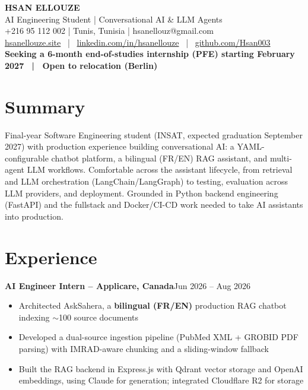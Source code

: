 \documentclass[10pt,a4paper]{article}
\newcommand{\entry}[2]{\vspace{1pt}\noindent\textbf{#1}\hfill{\color{muted}#2}\par}
\begin{document}
\begin{center}
  {\LARGE\bfseries HSAN ELLOUZE}\\[2pt]
  {\color{muted} AI Engineering Student | Conversational AI \& LLM Agents}\\[2pt]
  {\footnotesize +216 95 112 002 | Tunis, Tunisia | hsanellouz@gmail.com}\\[1pt]
  {\footnotesize \href{https://hsanellouze.site}{hsanellouze.site} \ | \ \href{https://linkedin.com/in/hsanellouze}{linkedin.com/in/hsanellouze} \ | \ \href{https://github.com/Hsan003}{github.com/Hsan003}}\\[3pt]
  {\footnotesize\bfseries Seeking a 6-month end-of-studies internship (PFE) starting February 2027 \ | \ Open to relocation (Berlin)}
\end{center}

\section{Summary}
Final-year Software Engineering student (INSAT, expected graduation September 2027) with production experience building conversational AI: a YAML-configurable chatbot platform, a bilingual (FR/EN) RAG assistant, and multi-agent LLM workflows. Comfortable across the assistant lifecycle, from retrieval and LLM orchestration (LangChain/LangGraph) to testing, evaluation across LLM providers, and deployment. Grounded in Python backend engineering (FastAPI) and the fullstack and Docker/CI-CD work needed to take AI assistants into production.

\section{Experience}
\entry{AI Engineer Intern -- Applicare, Canada}{Jun 2026 -- Aug 2026}
\begin{itemize}
  \item Architected AskSahera, a \textbf{bilingual (FR/EN)} production RAG chatbot indexing $\sim$100 source documents
  \item Developed a dual-source ingestion pipeline (PubMed XML + GROBID PDF parsing) with IMRAD-aware chunking and a sliding-window fallback
  \item Built the RAG backend in Express.js with Qdrant vector storage and OpenAI embeddings, using Claude for generation; integrated Cloudflare R2 for storage
\end{itemize}
\end{document}
